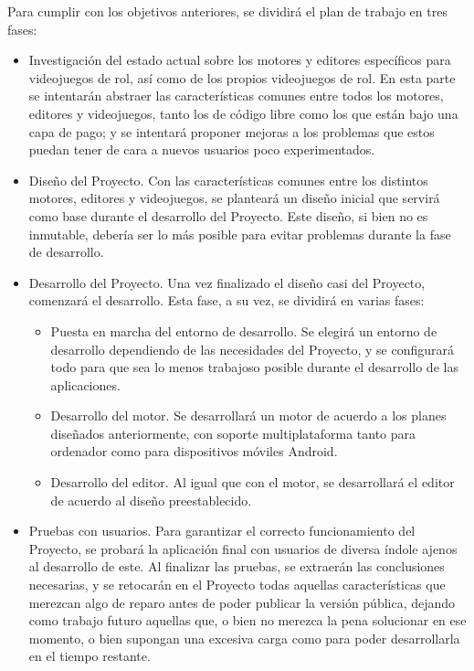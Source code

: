 Para cumplir con los objetivos anteriores, se dividirá el plan de trabajo en tres fases:
\begin{itemize}
	\item Investigación del estado actual sobre los motores y editores específicos para videojuegos de rol, así como de los propios videojuegos de rol. En esta parte se intentarán abstraer las características comunes entre todos los motores, editores y videojuegos, tanto los de código libre como los que están bajo una capa de pago; y se intentará proponer mejoras a los problemas que estos puedan tener de cara a nuevos usuarios poco experimentados.
	\item Diseño del Proyecto. Con las características comunes entre los distintos motores, editores y videojuegos, se planteará un diseño inicial que servirá como base durante el desarrollo del Proyecto. Este diseño, si bien no es inmutable, debería ser lo más  posible para evitar problemas durante la fase de desarrollo.
	\item Desarrollo del Proyecto. Una vez finalizado el diseño casi  del Proyecto, comenzará el desarrollo. Esta fase, a su vez, se dividirá en varias fases:
		\begin{itemize}
			\item Puesta en marcha del entorno de desarrollo. Se elegirá un entorno de desarrollo dependiendo de las necesidades del Proyecto, y se configurará todo para que sea lo menos trabajoso posible durante el desarrollo de las aplicaciones. 
			\item Desarrollo del motor. Se desarrollará un motor de acuerdo a los planes diseñados anteriormente, con soporte multiplataforma tanto para ordenador como para dispositivos móviles Android.
			\item Desarrollo del editor. Al igual que con el motor, se desarrollará el editor de acuerdo al diseño preestablecido.
		\end{itemize}
	\item Pruebas con usuarios. Para garantizar el correcto funcionamiento del Proyecto, se probará la aplicación final con usuarios de diversa índole ajenos al desarrollo de este. Al finalizar las pruebas, se extraerán las conclusiones necesarias, y se retocarán en el Proyecto todas aquellas características que merezcan algo de reparo antes de poder publicar la versión pública, dejando como trabajo futuro aquellas que, o bien no merezca la pena solucionar en ese momento, o bien supongan una excesiva carga como para poder desarrollarla en el tiempo restante.
\end{itemize}


